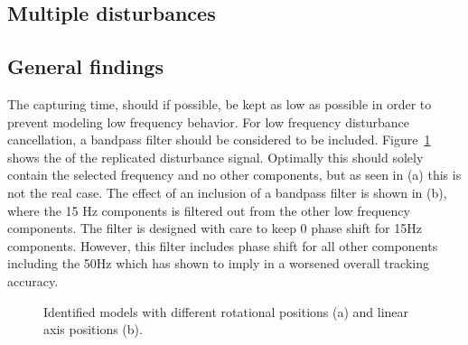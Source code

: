 \FloatBarrier
\subsection{Multiple disturbances}


\subsection{General findings}\label{subsec:longterm}

The capturing time, should if possible, be kept as low as possible in order to prevent modeling low frequency behavior. For low frequency disturbance cancellation, a bandpass filter should be considered to be included. Figure~\ref{fig:bandpass_imp} shows the \abbrFFT of the replicated disturbance signal. Optimally this should solely contain the selected frequency and no other components, but as seen in (a) this is not the real case. The effect of an inclusion of a bandpass filter is shown in (b), where the 15 Hz components is filtered out from the other low frequency components. The filter is designed with care to keep 0 phase shift for 15Hz components. However, this filter includes phase shift for all other components including the 50Hz which has shown to imply in a worsened overall tracking accuracy.

\begin{figure}[h!]
  \centering %
  \qquad
  \caption{\label{fig:bandpass_imp} Identified models with different rotational positions (a) and linear axis positions (b).}
\end{figure}
